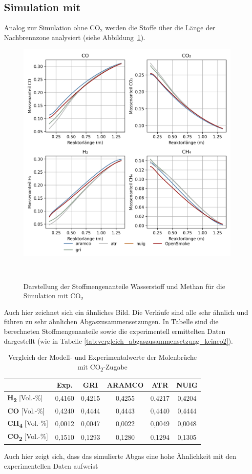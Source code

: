 \documentclass[footmark=none]{tubaf-thesis}
\begin{document}
        \subsection{Simulation mit }
        Analog zur Simulation ohne CO$_2$ werden die Stoffe über die Länge der Nachbrennzone analysiert (siehe Abbildung~\ref{fig:vergleich_h2_ch4_co2}).
        \begin{figure}[H]
            \centering
            \includegraphics[width=0.8\linewidth]{img_py/H2_CH4_CO_CO2.png}
            \caption{Darstellung der Stoffmengenanteile Wasserstoff und Methan für die Simulation mit CO$_2$}~\label{fig:vergleich_h2_ch4_co2}
        \end{figure}
        Auch hier zeichnet sich ein ähnliches Bild. Die Verläufe sind alle sehr ähnlich und führen zu sehr ähnlichen Abgaszusammensetzungen. In Tabelle sind die berechneten Stoffmengenanteile sowie die experimentell ermittelten Daten dargestellt (wie in Tabelle \ref{tab:vergleich_abgaszusammensetzung_keinco2}).
        \begin{table}[H]
            \centering\label{tab:vergleich_abgaszusammensetzung_co2}
            \caption{Vergleich der Modell- und Experimentalwerte der Molenbrüche mit CO\textsubscript{2}-Zugabe}
            \begin{tabular}{lccccc}
                \toprule
                & \textbf{Exp.} & \textbf{GRI} & \textbf{ARAMCO} & \textbf{ATR} & \textbf{NUIG} \\
                \midrule
                \textbf{H\textsubscript{2}} [Vol.-\%]   & 0,4160 & 0,4215 & 0,4255 & 0,4217 & 0,4204 \\
                \textbf{CO} [Vol.-\%]                  & 0,4240 & 0,4444 & 0,4443 & 0,4440 & 0,4444 \\
                \textbf{CH\textsubscript{4}} [Vol.-\%] & 0,0012 & 0,0047 & 0,0022 & 0,0049 & 0,0048 \\
                \textbf{CO\textsubscript{2}} [Vol.-\%] & 0,1510 & 0,1293 & 0,1280 & 0,1294 & 0,1305 \\
                \bottomrule
            \end{tabular}
        \end{table}
        Auch hier zeigt sich, dass das simulierte Abgas eine hohe Ähnlichkeit mit den experimentellen Daten aufweist
\end{document}

